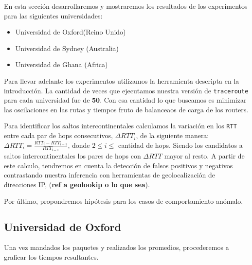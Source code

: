 En esta sección desarrollaremos y mostraremos los resultados de los experimentos para las siguientes
universidades:

\begin{itemize}
\item Universidad de Oxford(Reino Unido)
\item Universidad de Sydney (Australia)
\item Universidad de Ghana (Africa)
\end{itemize}

Para llevar adelante los experimentos utilizamos la herramienta descripta en la introducción. La cantidad de veces que ejecutamos nuestra versión de \texttt{traceroute} para cada universidad fue de \textbf{50}. Con esa cantidad lo que buscamos  es minimizar las oscilaciones en las rutas y tiempos fruto de balanceaos de carga de los routers.

Para identificar los saltos intercontinentales calculamos la variación en los \texttt{RTT} entre cada par de hops consecutivos, $\Delta RTT_{i}$, de la siguiente manera: \(\Delta RTT_{i} = \frac{RTT_{i} - RTT_{i-1}}{RTT_{i-1}}\), donde $2 \leq i \leq$ cantidad de hops. Siendo los candidatos a saltos intercontinentales los pares de hops con $\Delta RTT$ mayor al resto. A partir de este calculo, tendremos en cuenta la detección de falsos positivos y negativos contrastando nuestra inferencia con herramientas de geolocalización de direcciones IP, (\textbf{ref a geolookip o lo que sea}).

Por último, propondremos hipótesis para los casos de comportamiento anómalo.

\subsection{Universidad de Oxford}

Una vez mandados los paquetes y realizados los promedios, procederemos a graficar los tiempos resultantes.


